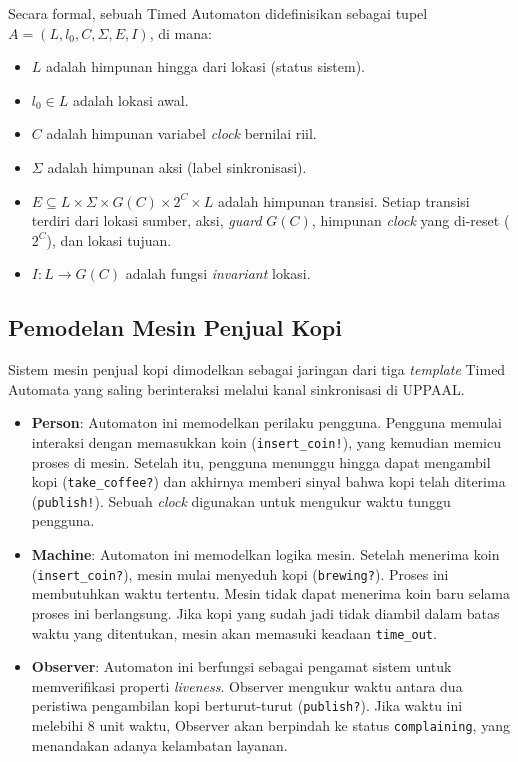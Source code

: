 \documentclass[12pt, a4paper]{article}
\begin{document}
Secara formal, sebuah Timed Automaton didefinisikan sebagai tupel $A = (L, l_0, C, \Sigma, E, I)$, di mana:
\begin{itemize}
    \item $L$ adalah himpunan hingga dari lokasi (status sistem).
    \item $l_0 \in L$ adalah lokasi awal.
    \item $C$ adalah himpunan variabel \textit{clock} bernilai riil.
    \item $\Sigma$ adalah himpunan aksi (label sinkronisasi).
    \item $E \subseteq L \times \Sigma \times G(C) \times 2^C \times L$ adalah himpunan transisi. Setiap transisi terdiri dari lokasi sumber, aksi, \textit{guard} $G(C)$, himpunan \textit{clock} yang di-reset ($2^C$), dan lokasi tujuan.
    \item $I: L \rightarrow G(C)$ adalah fungsi \textit{invariant} lokasi.
\end{itemize}

\subsection{Pemodelan Mesin Penjual Kopi}
Sistem mesin penjual kopi dimodelkan sebagai jaringan dari tiga \textit{template} Timed Automata yang saling berinteraksi melalui kanal sinkronisasi di UPPAAL.

\begin{itemize}
    \item \textbf{Person}: Automaton ini memodelkan perilaku pengguna. Pengguna memulai interaksi dengan memasukkan koin (\texttt{insert\_coin!}), yang kemudian memicu proses di mesin. Setelah itu, pengguna menunggu hingga dapat mengambil kopi (\texttt{take\_coffee?}) dan akhirnya memberi sinyal bahwa kopi telah diterima (\texttt{publish!}). Sebuah \textit{clock} digunakan untuk mengukur waktu tunggu pengguna.
    \item \textbf{Machine}: Automaton ini memodelkan logika mesin. Setelah menerima koin (\texttt{insert\_coin?}), mesin mulai menyeduh kopi (\texttt{brewing?}). Proses ini membutuhkan waktu tertentu. Mesin tidak dapat menerima koin baru selama proses ini berlangsung. Jika kopi yang sudah jadi tidak diambil dalam batas waktu yang ditentukan, mesin akan memasuki keadaan \texttt{time\_out}.
    \item \textbf{Observer}: Automaton ini berfungsi sebagai pengamat sistem untuk memverifikasi properti \textit{liveness}. Observer mengukur waktu antara dua peristiwa pengambilan kopi berturut-turut (\texttt{publish?}). Jika waktu ini melebihi 8 unit waktu, Observer akan berpindah ke status \texttt{complaining}, yang menandakan adanya kelambatan layanan.
\end{itemize}
\end{document}
